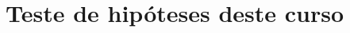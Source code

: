 \documentclass[8pt]{beamer}
\begin{document}
%
%
%

\section{Teste de hipóteses deste curso}
\end{document}
